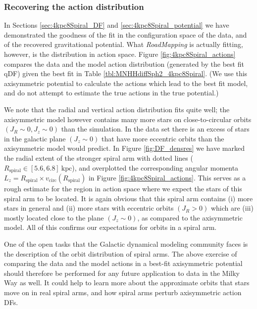 \documentclass[iop,revtex4,numberedappendix,appendixfloats]{emulateapj}
\newcommand{\RM}{{\sl RoadMapping}}
\begin{document}
\subsubsection{Recovering the action distribution} \label{sec:4kpc8Spiral_actions}

In Sections \ref{sec:4kpc8Spiral_DF} and \ref{sec:4kpc8Spiral_potential} we have demonstrated the goodness of the fit in the configuration space of the data, and of the recovered gravitational potential. What \RM{} is actually fitting, however, is the distribution in action space. Figure \ref{fig:4kpc8Spiral_actions} compares the data and the model action distribution (generated by the best fit qDF) given the best fit  in Table \ref{tbl:MNHHdiffSph2_4kpc8Spiral}. (We use this axisymmetric potential to calculate the actions which lead to the best fit model, and do not attempt to estimate the true actions in the true potential.)

We note that the radial and vertical action distribution fits quite well; the axisymmetric model however contains many more stars on close-to-circular orbits $(J_R \sim 0,J_z \sim 0)$ than the simulation. In the data set there is an excess of stars in the galactic plane $(J_z\sim0)$ that have more eccentric orbits  than the axisymmetric model would predict. In Figure \ref{fig:DF_densres} we have marked the radial extent of the stronger spiral arm with dotted lines ($R_\text{spiral} \in [5.6,6.8]~\text{kpc}$), and overplotted the corresponding angular momenta $L_z = R_\text{spiral} \times v_\text{circ}(R_\text{spiral})$ in Figure \ref{fig:4kpc8Spiral_actions}. This serves as a rough estimate for the region in action space where we expect the stars of this spiral arm to be located. It is again obvious that this spiral arm contains (i) more stars in general and (ii) more stars with eccentric orbits  $(J_R>0)$ which are (iii) mostly located close to the plane $(J_z\sim0)$, as compared to the axisymmetric model. All of this confirms our expectations for orbits in a spiral arm. 

One of the open tasks that the Galactic dynamical modeling community faces is the description of the orbit distribution of spiral arms. The above exercise of comparing the data and the model actions in a best-fit axisymmetric potential should therefore be performed for any future application to data in the Milky Way as well. It could help to learn more about the approximate orbits that stars move on in real spiral arms, and how spiral arms perturb axisymmetric action DFs.
\end{document}

